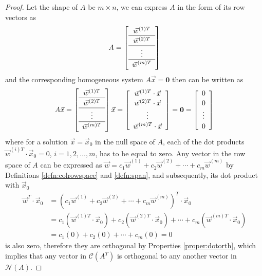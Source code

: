 \begin{proof}
Let the shape of $A$ be $m \times n$, we can express $A$ in the form of its row vectors as
\begin{align*}
A = 
\left[\begin{array}{c}
\vec{w}^{(1)T} \\
\hline
\vec{w}^{(2)T} \Tstrut \\
\hline
\vdots \\
\hline
\vec{w}^{(m)T} \Tstrut
\end{array}\right]
\end{align*}
and the corresponding homogeneous system $A\vec{x} = \textbf{0}$ then can be written as
\begin{align*}
A\vec{x} =
\left[\begin{array}{c}
\vec{w}^{(1)T} \\
\hline
\vec{w}^{(2)T} \Tstrut \\
\hline
\vdots \\
\hline
\vec{w}^{(m)T} \Tstrut
\end{array}\right]
\vec{x}
=
\left[\begin{array}{c}
\vec{w}^{(1)T} \cdot \vec{x} \\
\vec{w}^{(2)T} \cdot \vec{x} \Tstrut \\
\vdots \\
\vec{w}^{(m)T} \cdot \vec{x} \Tstrut
\end{array}\right]
= \textbf{0}
=
\left[\begin{array}{c}
0 \\
0 \Tstrut \\
\vdots \\
0 \Tstrut
\end{array}\right]
\end{align*}
where for a solution $\vec{x} = \vec{x}_0$ in the null space of $A$, each of the dot products $\vec{w}^{(i)T} \cdot \vec{x}_0 = 0$, $i = 1, 2, \ldots, m$, has to be equal to zero. Any vector in the row space of $A$ can be expressed as $\vec{w} = c_1\vec{w}^{(1)} + c_2\vec{w}^{(2)} + \cdots + c_m\vec{w}^{(m)}$ by Definitions \ref{defn:colrowspace} and \ref{defn:span}, and subsequently, its dot product with $\vec{x}_0$
\begin{align*}
\vec{w}^T \cdot \vec{x}_0 &= (c_1\vec{w}^{(1)} + c_2\vec{w}^{(2)} + \cdots + c_m\vec{w}^{(m)})^T \cdot \vec{x}_0 \\
&= c_1(\vec{w}^{(1)T} \cdot \vec{x}_0) + c_2(\vec{w}^{(2)T} \cdot \vec{x}_0) + \cdots + c_m(\vec{w}^{(m)T} \cdot \vec{x}_0) \\
&= c_1(0) + c_2(0) + \cdots + c_m(0) = 0
\end{align*}
is also zero, therefore they are orthogonal by Properties \ref{proper:dotorth}, which implies that any vector in $\mathcal{C}(A^T)$ is orthogonal to any another vector in $\mathcal{N}(A)$.
\end{proof}
